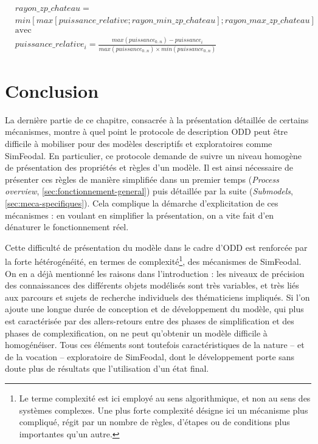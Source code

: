 \begin{equation}\label{eq:rayon-zp-chateau}
\begin{aligned}
& rayon\_zp\_chateau = \\
& min \left[ max \left[ puissance\_relative; rayon\_min\_zp\_chateau \right] ; rayon\_max\_zp\_chateau \right]
\\
& \text{avec}
\\
& puissance\_relative_i = \frac{max(puissance_{0..n}) - puissance_i}{max(puissance_{0..n}) \times min(puissance_{0..n})}
\end{aligned}
\end{equation}

\section*{Conclusion}

La dernière partie de ce chapitre, consacrée à la présentation détaillée de certains mécanismes, montre à quel point le protocole de description ODD peut être difficile à mobiliser pour des modèles descriptifs et exploratoires comme SimFeodal.
En particulier, ce protocole demande de suivre un niveau homogène de présentation des propriétés et règles d'un modèle.
Il est ainsi nécessaire de présenter ces règles de manière simplifiée dans un premier temps (\textit{Process overview}, \cref{sec:fonctionnement-general}) puis détaillée par la suite (\textit{Submodels}, \cref{sec:meca-specifiques}).
Cela complique la démarche d'explicitation de ces mécanismes : 
en voulant en simplifier la présentation, on a vite fait d'en dénaturer le fonctionnement réel.

Cette difficulté de présentation du modèle dans le cadre d'ODD est renforcée par la forte hétérogénéité, en termes de complexité\footnote{
Le terme complexité est ici employé au sens algorithmique, et non au sens des systèmes complexes.
Une plus forte complexité désigne ici un mécanisme plus \og compliqué\fg{}, régit par un nombre de règles, d'étapes ou de conditions plus importantes qu'un autre.
}, des mécanismes de SimFeodal.
On en a déjà mentionné les raisons dans l'introduction :
	les niveaux de précision des connaissances des différents objets modélisés sont très variables, et très liés aux parcours et sujets de recherche individuels des thématiciens impliqués.
Si l'on ajoute une \og longue durée\fg{} de conception et de développement du modèle, qui plus est caractérisée par des allers-retours entre des phases de simplification et des phases de complexification, on ne peut qu'obtenir un modèle difficile à homogénéiser.
Tous ces éléments sont toutefois caractéristiques de la nature -- et de la vocation -- exploratoire de SimFeodal, dont le développement porte sans doute plus de résultats que l'utilisation d'un état \og final\fg{}.

